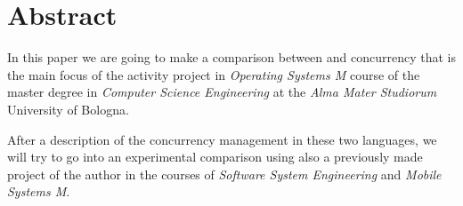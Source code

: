 \section*{Abstract}

In this paper we are going to make a comparison between \Kotlin and \Go concurrency that is the main focus of the activity project in \textit{Operating Systems M} course of the master degree in \textit{Computer Science Engineering} at the \textit{Alma Mater Studiorum} University of Bologna.

After a description of the concurrency management in these two languages, we will try to go into an experimental comparison using also a previously made project of the author in the courses of \textit{Software System Engineering} and \textit{Mobile Systems M}. 